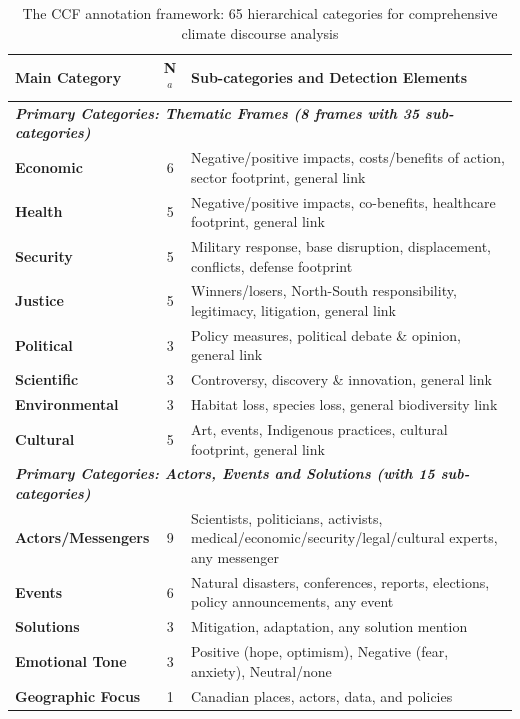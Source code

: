 \begin{table}[!ht]
\centering
\caption{The CCF annotation framework: 65 hierarchical categories for comprehensive climate discourse analysis}
\label{tab:framework_summary}
\footnotesize
\begin{tabularx}{\textwidth}{lcX}
\toprule
\rowcolor{gray!15}
\textbf{Main Category} & \textbf{N}$^a$ & \textbf{Sub-categories and Detection Elements} \\
\midrule
\multicolumn{3}{l}{\cellcolor{gray!10}\textbf{\textit{Primary Categories: Thematic Frames (8 frames with 35 sub-categories)}}} \\
\midrule
\textbf{Economic} & 6 & Negative/positive impacts, costs/benefits of action, sector footprint, general link \\
\textbf{Health} & 5 & Negative/positive impacts, co-benefits, healthcare footprint, general link \\
\textbf{Security} & 5 & Military response, base disruption, displacement, conflicts, defense footprint \\
\textbf{Justice} & 5 & Winners/losers, North-South responsibility, legitimacy, litigation, general link \\
\textbf{Political} & 3 & Policy measures, political debate \& opinion, general link \\
\textbf{Scientific} & 3 & Controversy, discovery \& innovation, general link \\
\textbf{Environmental} & 3 & Habitat loss, species loss, general biodiversity link \\
\textbf{Cultural} & 5 & Art, events, Indigenous practices, cultural footprint, general link \\
\midrule
\multicolumn{3}{l}{\cellcolor{gray!10}\textbf{\textit{Primary Categories: Actors, Events and Solutions (with 15 sub-categories)}}} \\
\midrule
\textbf{Actors/Messengers} & 9 & Scientists, politicians, activists, medical/economic/security/legal/cultural experts, any messenger \\
\textbf{Events} & 6 & Natural disasters, conferences, reports, elections, policy announcements, any event \\
\textbf{Solutions} & 3 & Mitigation, adaptation, any solution mention \\
\midrule
\cellcolor{gray!10}\textbf{Emotional Tone} & \cellcolor{gray!10}3 & \cellcolor{gray!10}Positive (hope, optimism), Negative (fear, anxiety), Neutral/none \\
\midrule
\cellcolor{gray!10}\textbf{Geographic Focus} & \cellcolor{gray!10}1 & \cellcolor{gray!10}Canadian places, actors, data, and policies \\

\end{tabularx}
\end{table}
